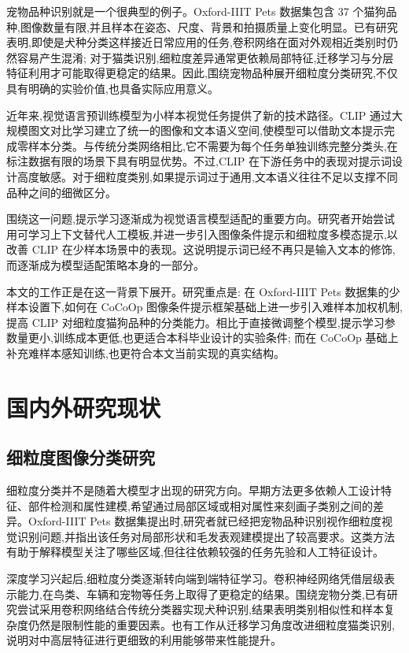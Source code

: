 宠物品种识别就是一个很典型的例子。Oxford-IIIT Pets 数据集包含 37 个猫狗品种,图像数量有限,并且样本在姿态、尺度、背景和拍摄质量上变化明显\cite{parkhi2012cats,oxfordpetsweb}。已有研究表明,即使是犬种分类这样接近日常应用的任务,卷积网络在面对外观相近类别时仍然容易产生混淆\cite{cuizhang2023classification}; 对于猫类识别,细粒度差异通常更依赖局部特征,迁移学习与分层特征利用才可能取得更稳定的结果\cite{wang2024enhancing}。因此,围绕宠物品种展开细粒度分类研究,不仅具有明确的实验价值,也具备实际应用意义。

近年来,视觉语言预训练模型为小样本视觉任务提供了新的技术路径。CLIP 通过大规模图文对比学习建立了统一的图像和文本语义空间,使模型可以借助文本提示完成零样本分类\cite{clip2021}。与传统分类网络相比,它不需要为每个任务单独训练完整分类头,在标注数据有限的场景下具有明显优势。不过,CLIP 在下游任务中的表现对提示词设计高度敏感。对于细粒度类别,如果提示词过于通用,文本语义往往不足以支撑不同品种之间的细微区分。

围绕这一问题,提示学习逐渐成为视觉语言模型适配的重要方向\cite{gu2023prompt,chen2023vlp}。研究者开始尝试用可学习上下文替代人工模板,并进一步引入图像条件提示和细粒度多模态提示,以改善 CLIP 在少样本场景中的表现\cite{coop2022,cocoop2022,liu2025fgmpl}。这说明提示词已经不再只是输入文本的修饰,而逐渐成为模型适配策略本身的一部分。

本文的工作正是在这一背景下展开。研究重点是: 在 Oxford-IIIT Pets 数据集的少样本设置下,如何在 CoCoOp 图像条件提示框架基础上进一步引入难样本加权机制,提高 CLIP 对细粒度猫狗品种的分类能力。相比于直接微调整个模型,提示学习参数量更小,训练成本更低,也更适合本科毕业设计的实验条件; 而在 CoCoOp 基础上补充难样本感知训练,也更符合本文当前实现的真实结构。

\section{国内外研究现状}

\subsection{细粒度图像分类研究}

细粒度分类并不是随着大模型才出现的研究方向。早期方法更多依赖人工设计特征、部件检测和属性建模,希望通过局部区域或相对属性来刻画子类别之间的差异。Oxford-IIIT Pets 数据集提出时,研究者就已经把宠物品种识别视作细粒度视觉识别问题,并指出该任务对局部形状和毛发表观建模提出了较高要求\cite{parkhi2012cats}。这类方法有助于解释模型关注了哪些区域,但往往依赖较强的任务先验和人工特征设计。

深度学习兴起后,细粒度分类逐渐转向端到端特征学习。卷积神经网络凭借层级表示能力,在鸟类、车辆和宠物等任务上取得了更稳定的结果。围绕宠物分类,已有研究尝试采用卷积网络结合传统分类器实现犬种识别,结果表明类别相似性和样本复杂度仍然是限制性能的重要因素\cite{cuizhang2023classification}。也有工作从迁移学习角度改进细粒度猫类识别,说明对中高层特征进行更细致的利用能够带来性能提升\cite{wang2024enhancing}。

